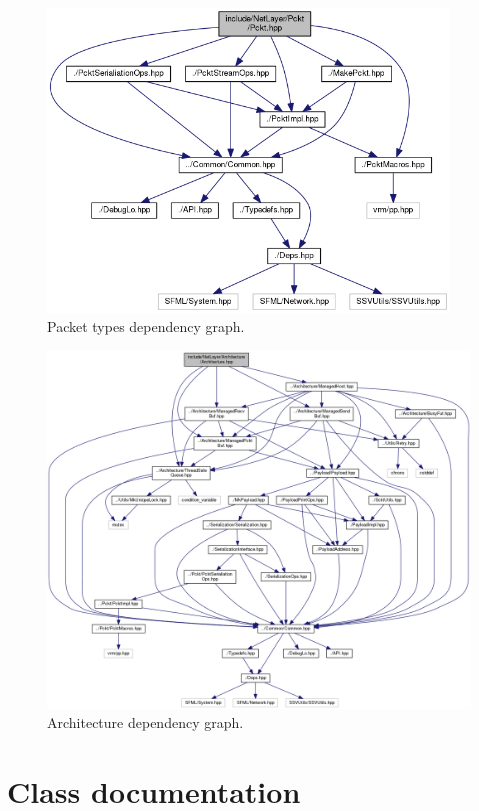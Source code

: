 \documentclass[12pt]{report}
\newcommand{\+}{\discretionary{\mbox{\scriptsize$\hookleftarrow$}}{}{}}
\begin{document}
    \begin{figure}[!htb]
    \caption{Packet types dependency graph.}
    \centering
    \includegraphics[width=0.95\textwidth]{inc/dep_pckt.png}
    \end{figure}

    \begin{figure}[!htb]
    \caption{Architecture dependency graph.}
    \centering
    \includegraphics[width=1\textwidth]{inc/dep_archi.png}
    \end{figure}

\chapter{Class documentation}
    
    
    
    
    
    
    
    
    
    
    
    
\end{document}
